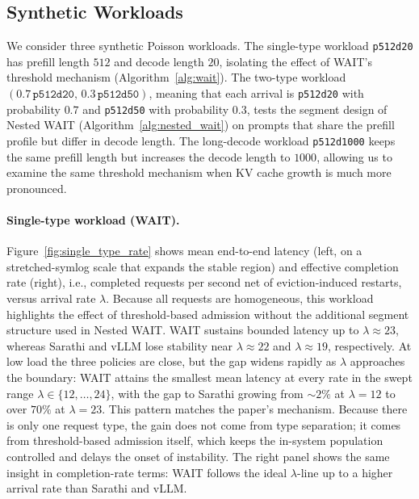 \subsection{Synthetic Workloads}
\label{sec:exp_synthetic}

We consider three synthetic Poisson workloads. The single-type workload \texttt{p512d20} has prefill length $512$ and decode length $20$, isolating the effect of WAIT's threshold mechanism (Algorithm~\ref{alg:wait}). The two-type workload $(0.7\,\texttt{p512d20},\,0.3\,\texttt{p512d50})$, meaning that each arrival is \texttt{p512d20} with probability $0.7$ and \texttt{p512d50} with probability $0.3$, tests the segment design of Nested WAIT (Algorithm~\ref{alg:nested_wait}) on prompts that share the prefill profile but differ in decode length. The long-decode workload \texttt{p512d1000} keeps the same prefill length but increases the decode length to $1000$, allowing us to examine the same threshold mechanism when KV cache growth is much more pronounced.

\paragraph{Single-type workload (WAIT).}
Figure~\ref{fig:single_type_rate} shows mean end-to-end latency (left, on a stretched-symlog scale that expands the stable region) and effective completion rate (right), i.e., completed requests per second net of eviction-induced restarts, versus arrival rate $\lambda$. Because all requests are homogeneous, this workload highlights the effect of threshold-based admission without the additional segment structure used in Nested WAIT. WAIT sustains bounded latency up to $\lambda \approx 23$, whereas Sarathi and vLLM lose stability near $\lambda \approx 22$ and $\lambda \approx 19$, respectively. At low load the three policies are close, but the gap widens rapidly as $\lambda$ approaches the boundary: WAIT attains the smallest mean latency at every rate in the swept range $\lambda \in \{12, \dots, 24\}$, with the gap to Sarathi growing from ${\sim}2\%$ at $\lambda = 12$ to over $70\%$ at $\lambda = 23$. This pattern matches the paper's mechanism. Because there is only one request type, the gain does not come from type separation; it comes from threshold-based admission itself, which keeps the in-system population controlled and delays the onset of instability. The right panel shows the same insight in completion-rate terms: WAIT follows the ideal $\lambda$-line up to a higher arrival rate than Sarathi and vLLM.

